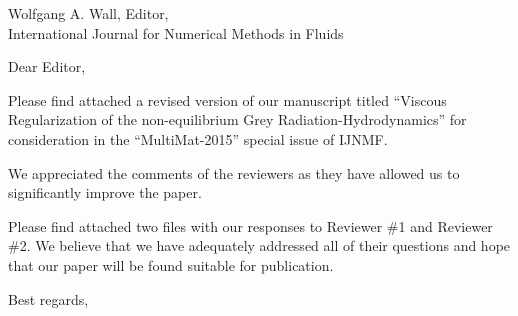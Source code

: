 
        \addtolength{\topmargin}{-4.0cm}    %
       \addtolength{\textheight}{7.5cm}    %

\address{Jean Ragusa\\ 
Department of Nuclear Engineering \\
Texas A\&M University\\
College Station, TX 77843-3133, USA\\
phone: (979) 862 2033\\
e-mail: jean.ragusa@tamu.edu \vspace{0.5cm}}


\signature{\vspace{-1.25cm}Marc-Olivier Delchini, Jean Ragusa, Jim Ferguson}   




\begin{letter}{
    Wolfgang A. Wall, Editor,\\
    International Journal for Numerical Methods in Fluids}
\date{\today}

\opening{Dear Editor,}
         \vspace{0.25cm}

Please find attached a revised version of our manuscript titled ``Viscous Regularization of the non-equilibrium Grey Radiation-Hydrodynamics'' for consideration in the ``MultiMat-2015'' special issue of IJNMF. 

We appreciated the comments of the reviewers as they have allowed us to significantly improve the paper.


Please find attached two files with our responses to Reviewer \#1 and Reviewer \#2. We believe that we have adequately addressed all of their questions and hope that our paper will be found suitable for publication.




\closing{Best regards, }

\end{letter}


